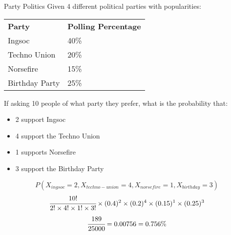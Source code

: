 \begin{examplebox}{Party Politics}
	Given 4 different political parties with popularities:
	\begin{center}
		\begin{tabular}{l l}
			\textbf{Party} & \textbf{Polling Percentage} \\
			Ingsoc         & 40\%                        \\
			Techno Union   & 20\%                        \\
			Norsefire      & 15\%                        \\
			Birthday Party & 25\%                        \\
		\end{tabular}
	\end{center}
	If asking 10 people of what party they prefer, what is the probability that:
	\begin{itemize}
		\item 2 support Ingsoc
		\item 4 support the Techno Union
		\item 1 supports Norsefire
		\item 3 support the Birthday Party
	\end{itemize}
	\[P(X_{ingsoc} = 2, X_{techno-union} = 4, X_{norsefire} = 1, X_{birthday} = 3)\]
	\[\cfrac{10!}{2! \times 4! \times 1! \times 3!} \times (0.4)^2 \times (0.2)^4 \times (0.15)^1 \times (0.25)^3\]
	\[\cfrac{189}{25000} = 0.00756 = 0.756\%\]
\end{examplebox}

